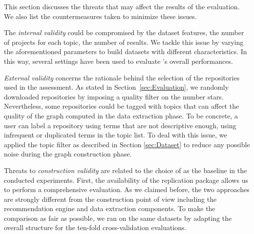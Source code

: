 
This section discusses the threats that may affect the results of the evaluation. We also list the countermeasures taken to minimize these issues.

The \emph{internal validity} could be compromised by the dataset features, \ie the number of projects for each topic, the number of results. We tackle this issue by varying the aforementioned parameters to build datasets with different characteristics. In this way, several settings have been used to evaluate \TF's overall performances.

\emph{External validity} concerns the rationale behind the selection of the \GH 
repositories used in the assessment. As stated in Section~\ref{sec:Evaluation}, we randomly downloaded repositories by imposing a 
quality filter on the number stars. Nevertheless, some repositories could be 
tagged with topics that can affect the quality of the graph computed in the 
data extraction phase. To be concrete, a user can label a repository using 
terms that are not descriptive enough, \ie using infrequent or duplicated terms 
in the topic list. To deal with this issue, we applied the topic filter as 
described in Section \ref{sec:Dataset} to reduce any possible noise during the 
graph construction phase.

Threats to \emph{construction validity} are related to the choice of \MNB as the baseline in the conducted experiments. First, the availability of the replication package allows us to perform a comprehensive evaluation. %
As we claimed before, the two approaches are strongly different from the construction point of view including the recommendation engine and data extraction components. To make the comparison as fair as possible, we ran \MNB on the same datasets by adapting the overall structure for the ten-fold cross-validation evaluations.
\vspace{-.25cm}